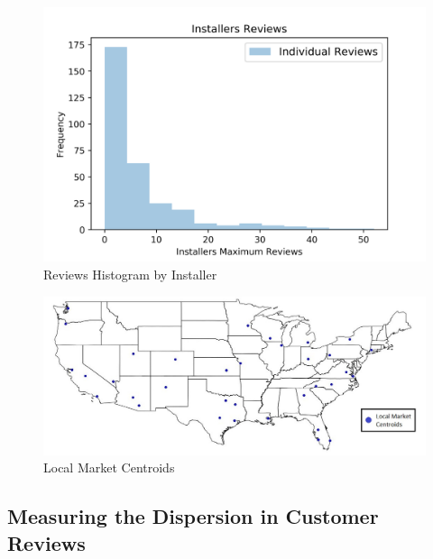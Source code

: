 \documentclass[msom,blindrev]{informs3}
\begin{document}





\begin{figure}
	\centering
	\includegraphics[width=1\linewidth]{histogram_ind_max_reviews_ct.png}
	\caption{Reviews Histogram by Installer}
	\label{histogram_ind_max_reviews_ct}
\end{figure}





\begin{figure}
	\centering
	\includegraphics[width=1\linewidth]{markets.jpg}
	\caption{Local Market Centroids}
	\label{fig:markets}
\end{figure}

\subsection{Measuring the Dispersion in Customer Reviews} \label{subsection_measure_dispersion}
\end{document}
